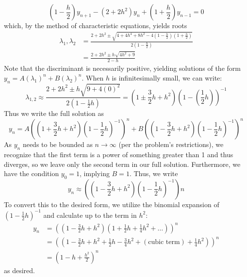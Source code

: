 \documentclass{article}
\begin{document}
\begin{equation*}
    (1-\frac{h}{2})y_{n+1} - (2+2h^2)y_n + (1+\frac{h}{2})y_{n-1} = 0
\end{equation*}
which, by the method of characteristic equations, yields roots
\begin{equation*}
    \begin{aligned}
    \lambda_1, \lambda_2 &= \frac{2+2h^2\pm \sqrt{4+4h^4+8h^2-4(1-\frac{h}{2})(1+\frac{h}{2})}}{2(1-\frac{h}{2})} \\
    &= \frac{2+2h^2\pm h\sqrt{4h^2+9}}{2-h}
    \end{aligned}
\end{equation*}
Note that the discriminant is necessarily positive, yielding solutions of the form $y_n = A(\lambda_1)^n + B(\lambda_2)^n$. When $h$ is infinitesimally small, we can write:
\begin{equation*}
    \lambda_{1, 2} \approx \frac{2 +2h^2 \pm h\sqrt{9 + 4(0)^2}}{2(1-\frac{1}{2}h)} = (1\pm \frac{3}{2}h+h^2)(1-(\frac{1}{2}h))^{-1}
\end{equation*}
Thus we write the full solution as
\begin{equation*}
   y_n= A((1+ \frac{3}{2}h+h^2)(1-\frac{1}{2}h)^{-1})^n + B((1 - \frac{3}{2}h+h^2)(1-\frac{1}{2}h)^{-1})^n
\end{equation*}
As $y_n$ needs to be bounded as $n \to \infty$ (per the problem's restrictions), we recognize that the first term is a power of something greater than 1 and thus diverges, so we leave only the second term in our full solution. Furthermore, we have the condition $y_0 = 1$, implying $B = 1$. Thus, we write
\begin{equation*}
    y_n \approx ((1-\frac{3}{2} h + h^2)(1-\frac{1}{2}h)^{-1})n
\end{equation*}
To convert this to the desired form, we utilize the binomial expansion of $(1-\frac{1}{2}h)^{-1}$ and calculate up to the term in $h^2$:
\begin{equation*}
    \begin{aligned}
        y_n&=((1-\frac{3}{2}h+h^2)(1+\frac{1}{2}h+\frac{1}{4}h^2+\dots))^n \\
        &=((1 - \frac{3}{2}h + h^2 + \frac{1}{2}h - \frac{3}{4} h^2 + (\text{cubic term}) + \frac{1}{4}h^2))^n \\
        &=(1-h+\frac{h^2}{2})^n
    \end{aligned}
\end{equation*}
as desired.
\\ \\
\end{document}
